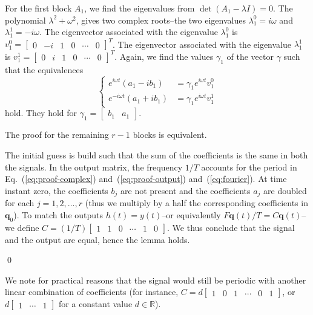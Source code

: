 \documentclass[letterpaper,10pt,journal,twoside]{IEEEtran}
\theoremstyle{definition}
\begin{document}
For the first block $A_1$, we find the eigenvalues from $\det(A_1-\lambda I)=0$. The polynomial $\lambda^2+\omega^2$, gives two complex roots--the two eigenvalues $\lambda_1^0=i\omega$ and $\lambda_1^1=-i\omega$. The eigenvector associated with the eigenvalue $\lambda_1^0$ is $v_1^0=\begin{bmatrix}0 & -i&1&0&\cdots&0\end{bmatrix}^T$. The eigenvector associated with the eigenvalue $\lambda_1^1$ is $v_1^1=\begin{bmatrix}0&i&1&0&\cdots&0\end{bmatrix}^T$. Again, we find the values $\gamma_1$ of the vector $\gamma$ such that the equivalences 
\begin{equation*}\begin{cases}
  e^{i\omega t}(a_1-ib_1)&=\gamma_1 e^{i\omega t}v_1^0\\
  e^{-i\omega t}(a_1+ib_1)&=\gamma_1 e^{i\omega t}v_1^1
\end{cases}\end{equation*}
hold. They hold for $\gamma_1=\begin{bmatrix}b_1&a_1\end{bmatrix}$. 

The proof for the remaining $r-1$ blocks is equivalent.

The initial guess is build such that the sum of the coefficients is the same in both the signals. In the output matrix, the frequency $1/T$ accounts for the period in Eq.~(\ref{eq:proof-complex}) and~(\ref{eq:proof-output}) and~(\ref{eq:fourier}). At time instant zero, the coefficients $b_j$ are not present and the coefficients $a_j$ are doubled for each $j=1,2,\dots,r$ (thus we multiply by a half the corresponding coefficients in $\mathbf{q}_0$). To match the outputs $h(t)=y(t)$--or equivalently $F\mathbf{q}(t)/T=C\mathbf{q}(t)$--we define $C=(1/T)\begin{bmatrix}1 & 1 & 0 & \cdots & 1 & 0\end{bmatrix}$. We thus conclude that the signal and the output are equal, hence the lemma holds.

\qed

We note for practical reasons that the signal would still be periodic with another linear combination of coefficients (for instance, $C=d\begin{bmatrix}1 & 0 & 1 & \cdots & 0 & 1\end{bmatrix}$, or $d\begin{bmatrix}1 & \cdots & 1\end{bmatrix}$ for a constant value $d\in\mathbb{R}$).
\end{document}
